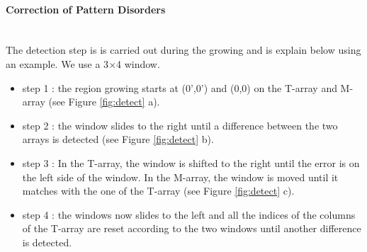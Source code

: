\paragraph*{Correction of Pattern Disorders}
~~\\
The detection step is is carried out during the growing and is explain below using an example. We use a 3$\times$4 window.
\begin{itemize}
\item step 1 : the region growing starts at (0',0') and (0,0) on the T-array and M-array (see Figure \ref{fig:detect} a).
\item step 2 : the window slides to the right until a difference between the two arrays is detected (see Figure \ref{fig:detect} b).
\item step 3 : In the T-array, the window is shifted to the right until the error is on the left side of the window. In the M-array, the window is moved until it matches with the one of the T-array (see Figure \ref{fig:detect} c).
\item step 4 : the windows now slides to the left and all the indices of the columns of the T-array are reset according to the two windows until another difference is detected.
\end{itemize}

